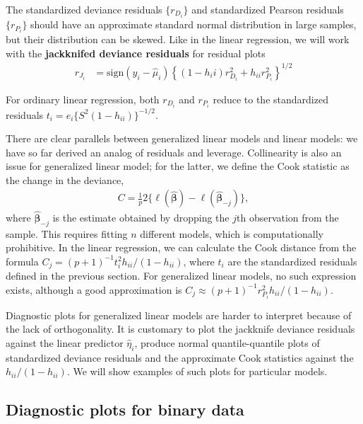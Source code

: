 \documentclass[
  11pt,
  letterpaper,
]{book}
\theoremstyle{definition}
\theoremstyle{definition}
\theoremstyle{definition}
\theoremstyle{definition}
\theoremstyle{remark}
\begin{document}
The standardized deviance residuals \(\{r_{D_i}\}\) and standardized
Pearson residuals \(\{r_{P_i}\}\) should have an approximate standard
normal distribution in large samples, but their distribution can be
skewed. Like in the linear regression, we will work with the
\textbf{jackknifed deviance residuals} for residual plots \begin{align*}
r_{J_i} &= \mathrm{sign}(y_i - \widehat{\mu}_i) \left\{ (1-{h_ii})r^2_{D_i} + h_{ii}r^2_{P_i}\right\}^{1/2}
\end{align*}

For ordinary linear regression, both \(r_{D_i}\) and \(r_{P_i}\) reduce to
the standardized residuals \(t_i=e_i\{S^2(1-h_{ii})\}^{-1/2}\).

There are clear parallels between generalized linear models and linear
models: we have so far derived an analog of residuals and leverage.
Collinearity is also an issue for generalized linear model; for the
latter, we define the Cook statistic as the change in the deviance,
\begin{align*}
C = \frac{1}{p} 2\{\ell(\widehat{\boldsymbol{\beta}}) - \ell(\widehat{\boldsymbol{\beta}}_{-j})\},
\end{align*}
where \(\widehat{\boldsymbol{\beta}}_{-j}\) is the estimate
obtained by dropping the \(j\)th observation from the sample. This
requires fitting \(n\) different models, which is computationally
prohibitive. In the linear regression, we can calculate the Cook
distance from the formula \(C_j = (p+1)^{-1}t_i^2h_{ii}/(1-h_{ii})\),
where \(t_i\) are the standardized residuals defined in the previous
section. For generalized linear models, no such expression exists,
although a good approximation is
\(C_j \approx (p+1)^{-1}r_{P_i}^2h_{ii}/(1-h_{ii})\).

Diagnostic plots for generalized linear models are harder to interpret
because of the lack of orthogonality. It is customary to plot the
jackknife deviance residuals against the linear predictor
\(\widehat{\eta}_i\), produce normal quantile-quantile plots of
standardized deviance residuals and the approximate Cook statistics
against the \(h_{ii}/(1-h_{ii})\). We will show examples of such plots for
particular models.

\hypertarget{diag-plots-binary}{%
\subsection{Diagnostic plots for binary data}\label{diag-plots-binary}}
\end{document}
